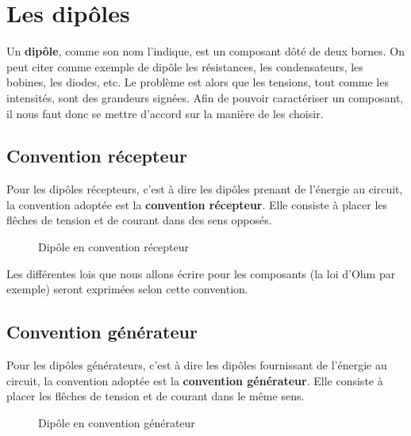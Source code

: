 \pagebreak
\section{Les dipôles}

Un \textbf{dipôle}, comme son nom l'indique, est un composant dôté de deux bornes. On peut citer comme exemple de dipôle les résistances, les condensateurs, les bobines, les diodes, etc. Le problème est alors que les tensions, tout comme les intensités, sont des grandeurs signées. Afin de pouvoir caractériser un composant, il nous faut donc se mettre d'accord sur la manière de les choisir.

\subsection*{Convention récepteur}

Pour les dipôles récepteurs, c'est à dire les dipôles prenant de l'énergie au circuit, la convention adoptée est la \textbf{convention récepteur}. Elle consiste à placer les flêches de tension et de courant dans des sens opposés. 

\begin{figure}[!h]
\centering

\caption{Dipôle en convention récepteur}
\end{figure}

Les différentes lois que nous allons écrire pour les composants (la loi d'Ohm par exemple) seront exprimées selon cette convention.

\subsection*{Convention générateur}

Pour les dipôles générateurs, c'est à dire les dipôles fournissant de l'énergie au circuit, la convention adoptée est la \textbf{convention générateur}. Elle consiste à placer les flêches de tension et de courant dans le même sens. 

\begin{figure}[!h]
\centering

\caption{Dipôle en convention générateur}
\end{figure}

